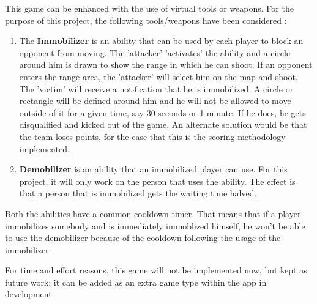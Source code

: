 \documentclass{article}
\begin{document}
This game can be enhanced with the use of virtual tools or weapons. For the
purpose of this project, the following tools/weapons have been considered :
\begin{enumerate}
	
	\item The \textbf{Immobilizer} is an ability that can be used by each player to
	block an opponent from moving. The 'attacker' 'activates' the ability and a
	circle around him is drawn to show the range in which he can shoot. If an
	opponent enters the range area, the 'attacker' will select him on the map and
	shoot. The 'victim' will receive a notification that he is immobilized. A
	circle or rectangle will be defined around him and he will not be allowed to
	move outside of it for a given time, say 30 seconds or 1 minute. If he does, he
	gets disqualified and kicked out of the game. An alternate solution would be
	that the team loses points, for the case that this is the scoring methodology
	implemented.
	 
	\item \textbf{Demobilizer} is an ability that an immobilized player can use.
	For this project, it will only work on the person that uses the ability. The
	effect is that a person that is immobilized gets the waiting time halved.
	
\end{enumerate}
Both the abilities have a common cooldown timer. That means that if a player
immobilizes somebody and is immediately immoblized himself, he won't be able to
use the demobilizer because of the cooldown following the usage of the
immobilizer.\newline

For time and effort reasons, this game will not be implemented now, but kept as
future work: it can be added as an extra game type within the app in
development.\newline
\end{document}
